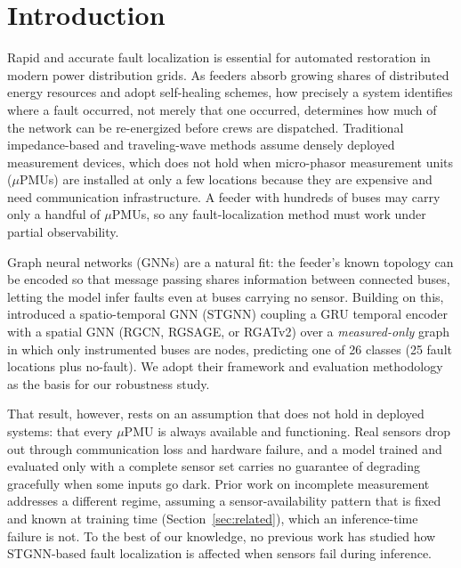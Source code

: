 \documentclass[3p,times,procedia]{elsarticle}
\begin{document}
\enlargethispage{-3\baselineskip}

\section{Introduction}

Rapid and accurate fault localization is essential for automated restoration in modern power distribution grids. As feeders absorb growing shares of distributed energy resources and adopt self-healing schemes, how precisely a system identifies where a fault occurred, not merely that one occurred, determines how much of the network can be re-energized before crews are dispatched. Traditional impedance-based and traveling-wave methods assume densely deployed measurement devices, which does not hold when micro-phasor measurement units ($\mu$PMUs) are installed at only a few locations because they are expensive and need communication infrastructure. A feeder with hundreds of buses may carry only a handful of $\mu$PMUs, so any fault-localization method must work under partial observability.

Graph neural networks (GNNs) are a natural fit: the feeder's known topology can be encoded so that message passing shares information between connected buses, letting the model infer faults even at buses carrying no sensor. Building on this, \cite{Karabulut2026} introduced a spatio-temporal GNN (STGNN) coupling a GRU temporal encoder with a spatial GNN (RGCN, RGSAGE, or RGATv2) over a \emph{measured-only} graph in which only instrumented buses are nodes, predicting one of 26 classes (25 fault locations plus no-fault). We adopt their framework and evaluation methodology as the basis for our robustness study.

That result, however, rests on an assumption that does not hold in deployed systems: that every $\mu$PMU is always available and functioning. Real sensors drop out through communication loss and hardware failure, and a model trained and evaluated only with a complete sensor set carries no guarantee of degrading gracefully when some inputs go dark. Prior work on incomplete measurement addresses a different regime, assuming a sensor-availability pattern that is fixed and known at training time (Section~\ref{sec:related}), which an inference-time failure is not. To the best of our knowledge, no previous work has studied how STGNN-based fault localization is affected when sensors fail during inference.
\end{document}
